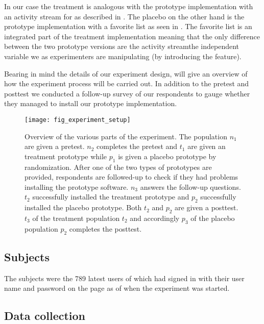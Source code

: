 In our case the treatment is analogous with the prototype implementation with
an activity stream for \urort{} as described in
.
The placebo on the other hand is the 
prototype implementation with a favorite list as seen in
.
The favorite list is an integrated part of the treatment implementation
meaning that the only difference between the two prototype versions are
the activity stream\dash{}the independent variable we as experimenters are
manipulating (by introducing the feature).

Bearing in mind the details of our experiment design,
 will give an overview of how the experiment
process will be carried out. In addition to the pretest and posttest we
conducted a follow-up survey of our respondents to gauge whether they managed
to install our prototype implementation.

\begin{figure}
  \texttt{[image: fig\_experiment\_setup]}
  \caption[Experiment Overview]{
    Overview of the various parts of the experiment. The population $n_1$
    are given a pretest. $n_2$ completes the pretest and $t_1$ are given
    an treatment prototype while $p_1$ is given a placebo
    prototype by randomization.
    After one of the two types of prototypes are provided, respondents are
    followed-up to check if they had problems installing the prototype
    software. $n_3$ answers the follow-up questions.
    $t_2$ successfully installed the treatment prototype and $p_2$
    successfully installed the placebo prototype. Both $t_2$ and $p_2$ are
    given a posttest.
    $t_3$ of the treatment population $t_2$ and accordingly $p_3$ of the
    placebo population $p_2$ completes the posttest.
  }
  \label{figure:fig.experiment.setup}
\end{figure}

\subsection{Subjects}

The subjects were the 789 latest users of \urort{} which had
signed in with their user name and password on the \urort{} page as of when
the experiment was started.

\subsection{Data collection}

